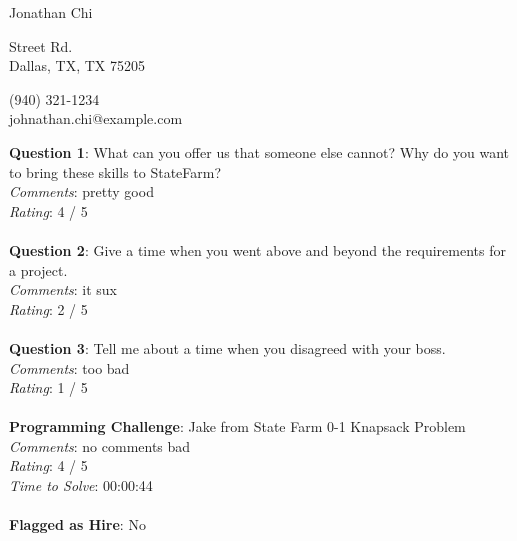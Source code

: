 \documentclass[12pt]{article}
\begin{document}
{\LARGE \begin{center}Jonathan Chi\end{center}}

\begin{multicols}{2}
 Street Rd. \\
Dallas, TX, TX 75205
\columnbreak

\noindent
(940) 321-1234 \\
johnathan.chi@example.com
\end{multicols}

\noindent
\textbf{Question 1}: What can you offer us that someone else cannot? Why do you want to bring these skills to StateFarm?
\\\noindent
\textit{Comments}: pretty good
\\\noindent
\textit{Rating}: 4 / 5
\\\\
\noindent
\textbf{Question 2}: Give a time when you went above and beyond the requirements for a project.
\\\noindent
\textit{Comments}: it sux
\\\noindent
\textit{Rating}: 2 / 5
\\\\
\noindent
\textbf{Question 3}: Tell me about a time when you disagreed with your boss.
\\\noindent
\textit{Comments}: too bad
\\\noindent
\textit{Rating}: 1 / 5
\\\\
\noindent
\textbf{Programming Challenge}: Jake from State Farm 0-1 Knapsack Problem
\\\noindent
\textit{Comments}: no comments bad 
\\\noindent
\textit{Rating}: 4 / 5
\\\noindent
\textit{Time to Solve}: 00:00:44
\\\\
\textbf{Flagged as Hire}: No
\\\\ 
\end{document}
